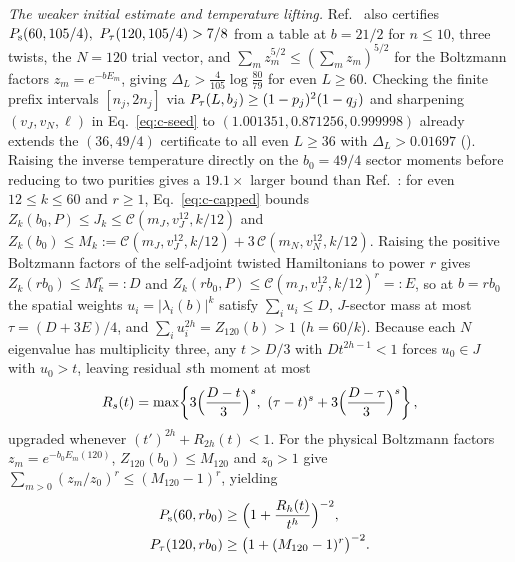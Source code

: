 \documentclass[aps,prl,reprint,amsmath,amssymb,nofootinbib,raggedbottom]{revtex4-2}
\begin{document}
\newcommand{\gaugecancel}{\tikz[tn]{
 \draw (-.55,0)--(6.45,0);
 \foreach \x in {.35,5.55}{\draw[phys] (\x,-.8)--(\x,.8);}
 \node[mpo] at (.35,0) {$W_j$};
 \node[sym,minimum height=.85em,inner xsep=1.5pt] at (2.05,0) {$G^{-1}$};
 \node[sym,minimum height=.85em,inner xsep=2pt] at (3.75,0) {$G$};
 \node[mpo] at (5.55,0) {$W_{j+1}$};}}
\newcommand{\gaugedpair}{\tikz[tn]{
 \draw (-.55,0)--(3.15,0);
 \foreach \x in {.4,2.2}{\draw[phys] (\x,-.8)--(\x,.8);}
 \node[mpo] at (.4,0) {$\widetilde W_j$};
 \node[mpo] at (2.2,0) {$\widetilde W_{j+1}$};}}
\emph{The weaker initial estimate and temperature lifting.}
Ref.~\cite{source} also certifies $P_{\mathrm s}(60,105/4),\ P_{\tau}(120,105/4)>7/8$ from a
table at $b=21/2$ for $n\le10$, three twists, the $N=120$ trial vector, and
$\sum_m z_m^{5/2}\le(\sum_m z_m)^{5/2}$ for the Boltzmann factors $z_m=e^{-bE_m}$,
giving $\Delta_L>\frac4{105}\log\frac{80}{79}$ for even $L\ge60$. Checking the
finite prefix intervals $[n_j,2n_j]$ via $P_{\tau}(L,b_j)\ge(1-p_j)^2(1-q_j)$ and
sharpening $(v_J,v_N,\ell)$ in Eq.~\eqref{eq:c-seed} to
$(1.001351,0.871256,0.999998)$ already extends the $(36,49/4)$ certificate to
all even $L\ge36$ with $\Delta_L>0.01697$ ().
Raising the inverse temperature directly on the $b_0=49/4$ sector moments before
reducing to two purities gives a $19.1\times$ larger bound than Ref.~\cite{main}:
for even $12\le k\le60$ and $r\ge1$, Eq.~\eqref{eq:c-capped} bounds
$Z_k(b_0,P)\le J_k\le\mathcal C(m_J,v_J^{12},k/12)$ and
$Z_k(b_0)\le M_k:=\mathcal C(m_J,v_J^{12},k/12)+3\,\mathcal C(m_N,v_N^{12},k/12)$.
Raising the positive Boltzmann factors of the self-adjoint twisted Hamiltonians
to power $r$ gives $Z_k(rb_0)\le M_k^r=:D$ and
$Z_k(rb_0,P)\le\mathcal C(m_J,v_J^{12},k/12)^r=:E$, so at $b=rb_0$ the spatial
weights $u_i=|\lambda_i(b)|^k$ satisfy $\sum_i u_i\le D$, $J$-sector mass at
most $\tau=(D+3E)/4$, and $\sum_i u_i^{2h}=Z_{120}(b)>1$ ($h=60/k$). Because
each $N$ eigenvalue has multiplicity three, any $t>D/3$ with $Dt^{2h-1}<1$
forces $u_0\in J$ with $u_0>t$, leaving residual $s$th moment at most
\begin{equation}
 R_s(t)=\max\!\left\{3\Bigl(\frac{D-t}{3}\Bigr)^s,\
 (\tau-t)^s+3\Bigl(\frac{D-\tau}{3}\Bigr)^s\right\},
 \label{eq:c-resid-lift}
\end{equation}
upgraded whenever $(t')^{2h}+R_{2h}(t)<1$. For the physical Boltzmann factors
$z_m=e^{-b_0E_m(120)}$, $Z_{120}(b_0)\le M_{120}$ and $z_0>1$ give
$\sum_{m>0}(z_m/z_0)^r\le(M_{120}-1)^r$, yielding
\begin{equation}
 \begin{aligned}
 P_{\mathrm s}(60,rb_0)&\ge\Bigl(1+\frac{R_h(t)}{t^h}\Bigr)^{-2},\\
 P_{\tau}(120,rb_0)&\ge\bigl(1+(M_{120}-1)^r\bigr)^{-2}.
 \end{aligned}
 \label{eq:c-templift}
\end{equation}
\end{document}
